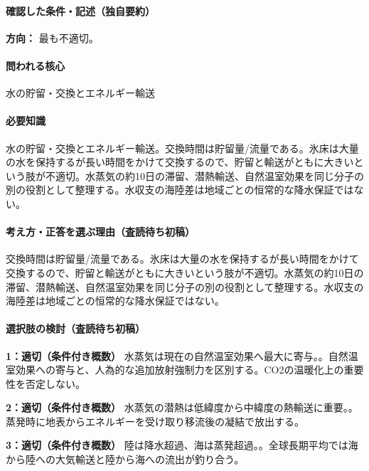 \paragraph{確認した条件・記述（独自要約）}\mbox{}\par

\noindent\textbf{方向：} 最も不適切。\par

\paragraph{問われる核心} 水の貯留・交換とエネルギー輸送

\paragraph{必要知識} 水の貯留・交換とエネルギー輸送。交換時間は貯留量/流量である。氷床は大量の水を保持するが長い時間をかけて交換するので、貯留と輸送がともに大きいという肢が不適切。水蒸気の約10日の滞留、潜熱輸送、自然温室効果を同じ分子の別の役割として整理する。水収支の海陸差は地域ごとの恒常的な降水保証ではない。

\paragraph{考え方・正答を選ぶ理由（査読待ち初稿）} 交換時間は貯留量/流量である。氷床は大量の水を保持するが長い時間をかけて交換するので、貯留と輸送がともに大きいという肢が不適切。水蒸気の約10日の滞留、潜熱輸送、自然温室効果を同じ分子の別の役割として整理する。水収支の海陸差は地域ごとの恒常的な降水保証ではない。

\paragraph{選択肢の検討（査読待ち初稿）}\mbox{}\par

\noindent\textbf{1：適切（条件付き概数）} 水蒸気は現在の自然温室効果へ最大に寄与。。自然温室効果への寄与と、人為的な追加放射強制力を区別する。CO2の温暖化上の重要性を否定しない。\par

\noindent\textbf{2：適切（条件付き概数）} 水蒸気の潜熱は低緯度から中緯度の熱輸送に重要。。蒸発時に地表からエネルギーを受け取り移流後の凝結で放出する。\par

\noindent\textbf{3：適切（条件付き概数）} 陸は降水超過、海は蒸発超過。。全球長期平均では海から陸への大気輸送と陸から海への流出が釣り合う。\par

